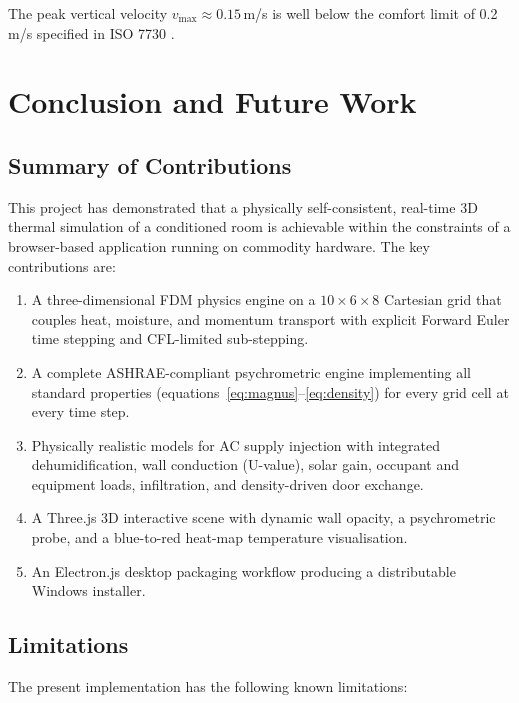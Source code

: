 \documentclass[12pt,a4paper]{report}
\begin{document}
The peak vertical velocity $v_\text{max} \approx 0.15$\,m/s is well below the comfort limit of 0.2\,m/s specified in ISO 7730 \cite{iso7730}.

\chapter{Conclusion and Future Work}
\label{ch:conclusion}

\section{Summary of Contributions}
\label{sec:summary}

This project has demonstrated that a physically self-consistent, real-time 3D thermal simulation of a conditioned room is achievable within the constraints of a browser-based application running on commodity hardware. The key contributions are:

\begin{enumerate}
  \item A three-dimensional FDM physics engine on a $10\times6\times8$ Cartesian grid that couples heat, moisture, and momentum transport with explicit Forward Euler time stepping and CFL-limited sub-stepping.
  \item A complete ASHRAE-compliant psychrometric engine implementing all standard properties (equations~\ref{eq:magnus}--\ref{eq:density}) for every grid cell at every time step.
  \item Physically realistic models for AC supply injection with integrated dehumidification, wall conduction (U-value), solar gain, occupant and equipment loads, infiltration, and density-driven door exchange.
  \item A Three.js 3D interactive scene with dynamic wall opacity, a psychrometric probe, and a blue-to-red heat-map temperature visualisation.
  \item An Electron.js desktop packaging workflow producing a distributable Windows installer.
\end{enumerate}

\section{Limitations}
\label{sec:limitations}

The present implementation has the following known limitations:
\end{document}
